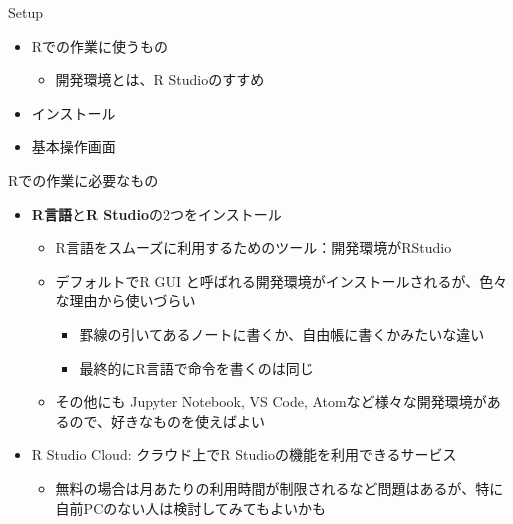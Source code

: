 \documentclass[
  ignorenonframetext,
]{beamer}
\providecommand{\tightlist}{%
  \setlength{\itemsep}{0pt}\setlength{\parskip}{0pt}}
\begin{document}
\begin{frame}[fragile]{Setup}
\protect\hypertarget{setup}{}
\begin{itemize}
\tightlist
\item
  Rでの作業に使うもの

  \begin{itemize}
  \tightlist
  \item
    開発環境とは、R Studioのすすめ
  \end{itemize}
\item
  インストール
\item
  基本操作画面
\end{itemize}

\begin{block}{Rでの作業に必要なもの}
\protect\hypertarget{rux3067ux306eux4f5cux696dux306bux5fc5ux8981ux306aux3082ux306e}{}
\begin{itemize}
\tightlist
\item
  \textbf{R言語}と\textbf{R Studio}の2つをインストール

  \begin{itemize}
  \tightlist
  \item
    R言語をスムーズに利用するためのツール：開発環境がRStudio
  \item
    デフォルトでR GUI
    と呼ばれる開発環境がインストールされるが、色々な理由から使いづらい

    \begin{itemize}
    \tightlist
    \item
      罫線の引いてあるノートに書くか、自由帳に書くかみたいな違い
    \item
      最終的にR言語で命令を書くのは同じ
    \end{itemize}
  \item
    その他にも Jupyter Notebook, VS Code,
    Atomなど様々な開発環境があるので、好きなものを使えばよい
  \end{itemize}
\item
  R Studio Cloud: クラウド上でR Studioの機能を利用できるサービス

  \begin{itemize}
  \tightlist
  \item
    無料の場合は月あたりの利用時間が制限されるなど問題はあるが、特に自前PCのない人は検討してみてもよいかも
  \end{itemize}
\end{itemize}
\end{block}


\end{frame}
\end{document}
